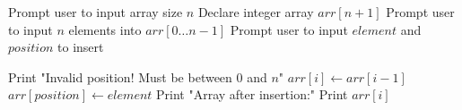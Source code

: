 \begin{algorithm}[H]
\caption{Insert Element into an Array at Given Position}
\begin{algorithmic}[1]
\STATE Prompt user to input array size $n$
\STATE Declare integer array $arr[n+1]$
\STATE Prompt user to input $n$ elements into $arr[0 \ldots n-1]$
\STATE Prompt user to input $element$ and $position$ to insert

    \STATE Print "Invalid position! Must be between 0 and $n$"
\ELSE
        \STATE $arr[i] \gets arr[i - 1]$
    \ENDFOR
    \STATE $arr[position] \gets element$
    \STATE Print "Array after insertion:"
        \STATE Print $arr[i]$
    \ENDFOR
\ENDIF

\end{algorithmic}
\end{algorithm}